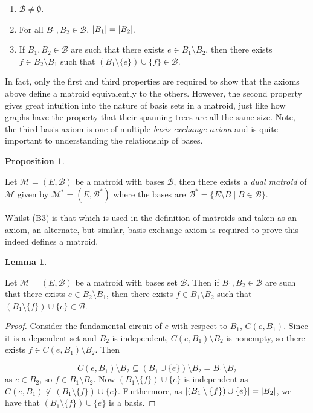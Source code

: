 \documentclass[12pt]{report}
\theoremstyle{definition}
\newtheorem{proposition}[theorem]{Proposition}
\newtheorem{lemma}[theorem]{Lemma}
\DeclarePairedDelimiter\abs{\lvert}{\rvert}
\def\calB{\mathcal B}
\def\calM{\mathcal M}
\theoremstyle{upright}
\begin{document}
\begin{enumerate}[label=(B\arabic*), leftmargin=*, align=left]

    \item $\calB\neq\emptyset$.
    \item For all $B_1, B_2\in\calB$, $\abs*{B_1}=\abs*{B_2}$.
    \item If $B_1, B_2\in\calB$ are such that there exists $e\in B_1\setminus B_2$, then there exists $f\in B_2\setminus B_1$ such that $(B_1\setminus\{e\})\cup\{f\}\in\calB$.
    
\end{enumerate}

In fact, only the first and third properties are required to show that the axioms above define a matroid equivalently to the others.
However, the second property gives great intuition into the nature of basis sets in a matroid, just like how graphs have the property that their spanning trees are all the same size.
Note, the third basis axiom is one of multiple \textit{basis exchange axiom} and is quite important to understanding the relationship of bases.

\begin{proposition}\label{prop:DualMatroid}

    Let $\calM=(E, \calB)$ be a matroid with bases $\calB$, then there exists a \textit{dual matroid} of $\calM$ given by $\calM^\ast=(E, \calB^\ast)$ where the bases are $\calB^\ast=\{E\setminus B\;|\;B\in\calB\}$.
    
\end{proposition}

Whilst (B3) is that which is used in the definition of matroids and taken as an axiom, an alternate, but similar, basis exchange axiom is required to prove this indeed defines a matroid.

\begin{lemma}\label{lem:AltBasisExch}

    Let $\calM=(E, \calB)$ be a matroid with bases set $\calB$.
    Then if $B_1, B_2\in\calB$ are such that there exists $e\in B_2\setminus B_1$, then there exists $f\in B_1\setminus B_2$ such that $(B_1\setminus\{f\})\cup\{e\}\in\calB$.
    
\end{lemma}

\begin{proof}

    Consider the fundamental circuit of $e$ with respect to $B_1$, $C(e, B_1)$.
    Since it is a dependent set and $B_2$ is independent, $C(e, B_1)\setminus B_2$ is nonempty, so there exists $f\in C(e, B_1)\setminus B_2$.
    Then
    
    \[C(e, B_1)\setminus B_2\subseteq (B_1\cup\{e\})\setminus B_2=B_1\setminus B_2\]
    as $e\in B_2$, so $f\in B_1\setminus B_2$.
    Now $(B_1\setminus\{f\})\cup\{e\}$ is independent as $C(e, B_1)\not\subseteq(B_1\setminus\{f\})\cup\{e\}$.
    Furthermore, as $\abs*{(B_1\setminus\{f\})\cup\{e\}}=\abs*{B_2}$, we have that $(B_1\setminus\{f\})\cup\{e\}$ is a basis.
    
\end{proof}
\end{document}

